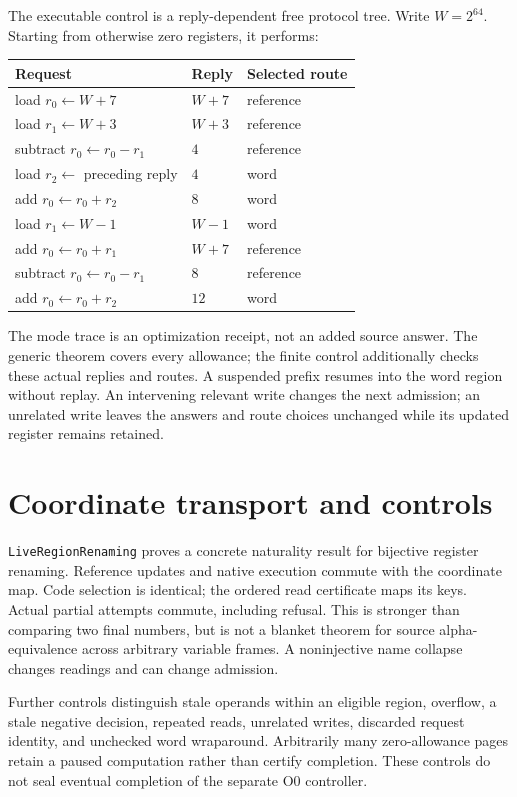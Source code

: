 \documentclass[11pt,a4paper]{article}
\newcommand{\code}[1]{\nolinkurl{#1}}
\begin{document}
The executable control is a reply-dependent free protocol tree. Write
$W=2^{64}$. Starting from otherwise zero registers, it performs:
\begin{center}
\begin{tabular}{lll}
\toprule
Request & Reply & Selected route\\
\midrule
load $r_0\gets W+7$ & $W+7$ & reference\\
load $r_1\gets W+3$ & $W+3$ & reference\\
subtract $r_0\gets r_0-r_1$ & $4$ & reference\\
load $r_2\gets$ preceding reply & $4$ & word\\
add $r_0\gets r_0+r_2$ & $8$ & word\\
load $r_1\gets W-1$ & $W-1$ & word\\
add $r_0\gets r_0+r_1$ & $W+7$ & reference\\
subtract $r_0\gets r_0-r_1$ & $8$ & reference\\
add $r_0\gets r_0+r_2$ & $12$ & word\\
\bottomrule
\end{tabular}
\end{center}
The mode trace is an optimization receipt, not an added source answer.
The generic theorem covers every allowance; the finite control additionally
checks these actual replies and routes. A suspended prefix resumes into the
word region without replay. An intervening relevant write changes the next
admission; an unrelated write leaves the answers and route choices unchanged
while its updated register remains retained.

\section{Coordinate transport and controls}

\code{LiveRegionRenaming} proves a concrete naturality result for bijective
register renaming. Reference updates and native execution commute with the
coordinate map. Code selection is identical; the ordered read certificate
maps its keys. Actual partial attempts commute, including refusal. This is
stronger than comparing two final numbers, but is not a blanket theorem for
source alpha-equivalence across arbitrary variable frames. A noninjective
name collapse changes readings and can change admission.

Further controls distinguish stale operands within an eligible region,
overflow, a stale negative decision, repeated reads, unrelated writes,
discarded request identity, and unchecked word wraparound. Arbitrarily many
zero-allowance pages retain a paused computation rather than certify completion.
These controls do not seal eventual completion of the separate O0 controller.
\end{document}
